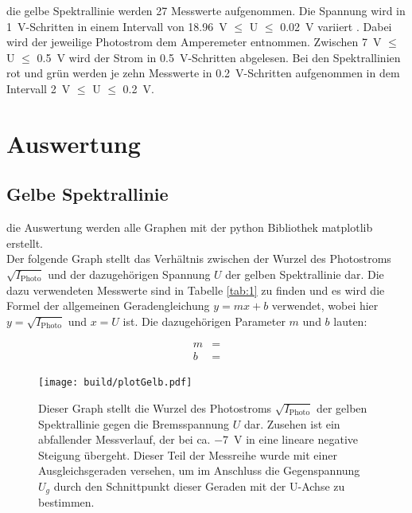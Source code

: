     \justifying die gelbe Spektrallinie werden 27 Messwerte aufgenommen. Die Spannung wird in \SI{1}{\volt}-Schritten in einem Intervall von 
    \SI{18.96}{\volt} $\leq$ U $\leq$ \SI{0.02}{\volt} variiert . Dabei wird der jeweilige Photostrom dem Amperemeter entnommen. Zwischen \SI{7}{\volt} $\leq$ U $\leq$ \SI{0.5}{\volt}
    wird der Strom in \SI{0.5}{\volt}-Schritten abgelesen.
    Bei den Spektrallinien rot und grün werden je zehn Messwerte in \SI{0.2}{\volt}-Schritten aufgenommen in dem Intervall \SI{2}{\volt} $\leq$ U $\leq$ \SI{0.2}{\volt}. 

\section{Auswertung}

\subsection{Gelbe Spektrallinie}

    \justifying die Auswertung werden alle Graphen mit der python Bibliothek matplotlib \cite{matplotlib} erstellt.\\
    Der folgende Graph stellt das Verhältnis zwischen der Wurzel des Photostroms $\sqrt{I_{\text{Photo}}}$ und der dazugehörigen Spannung $U$ der gelben Spektrallinie dar. Die dazu verwendeten Messwerte sind 
    in Tabelle \ref{tab:1} zu finden und es wird die Formel der allgemeinen Geradengleichung $y=mx+b$ verwendet, wobei hier $y=\sqrt{I_{\text{Photo}}}$ und $x=U$ ist. Die dazugehörigen 
    Parameter $m$ und $b$ lauten:

    \begin{align}
    m &= \text{} \label{eq:6}\\
    b &= \text{} \label{eq:7}
    \end{align}

    \begin{figure}[H]
        \centering
        \texttt{[image: build/plotGelb.pdf]}
        \caption{Dieser Graph stellt die Wurzel des Photostroms $\sqrt{I_{\text{Photo}}}$ der gelben Spektrallinie gegen die Bremsspannung $U$ dar. Zusehen ist ein abfallender Messverlauf, der
        bei ca. \SI{-7}{\volt} in eine lineare negative Steigung übergeht. Dieser Teil der Messreihe wurde mit einer Ausgleichsgeraden versehen, um im Anschluss die Gegenspannung
        $U_g$ durch den Schnittpunkt dieser Geraden mit der U-Achse zu bestimmen.}
        \label{fig:7}
    \end{figure}

